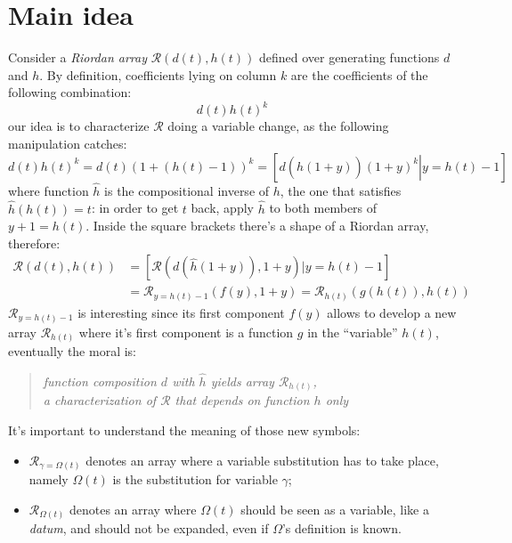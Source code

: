 
\section{Main idea}

Consider a \emph{Riordan array} $\mathcal{R}\left(d(t),h(t)\right)$ 
defined over generating functions $d$ and $h$. 
By definition, coefficients lying on 
column $k$ are the coefficients of the following combination:
\begin{displaymath}
    d(t)h(t)^k
\end{displaymath}
our idea is to characterize $\mathcal{R}$ doing a variable change, as the
following manipulation catches:
\begin{displaymath}
    d(t)h(t)^k = d(t)(1 + (h(t)-1))^k = \left[ \left. d(\hat{h}(1+y))(1+y)^k \right|y = h(t)-1  \right]
\end{displaymath}
where function $\hat{h}$ is the compositional inverse of $h$, the one that
satisfies $\hat{h}(h(t)) = t$: in order to get $t$ back, apply $\hat{h}$ to
both members of $y+1 = h(t)$.
Inside the square brackets there's a shape of a Riordan array, therefore:
\begin{displaymath}
    \begin{split}
        \mathcal{R}\left(d(t),h(t)\right) &= \left[ \mathcal{R}\left(d(\hat{h}(1+y)), 1+y\right) \left| y = h(t)-1 \right. \right]\\
        &= \mathcal{R}_{y=h(t)-1}\left( f(y), 1+y \right) =  \mathcal{R}_{h(t)}\left( g(h(t)), h(t) \right) 
    \end{split}
\end{displaymath}
$\mathcal{R}_{y=h(t)-1}$ is interesting since its first component $f(y)$ allows to 
develop a new array $\mathcal{R}_{h(t)}$ where it's first component
is a function $g$ in the ``variable'' $h(t)$, eventually the moral is:
\begin{quote}
    \emph{function composition $d$ with $\hat{h}$ yields array $\mathcal{R}_{h(t)}$,\\
        a characterization of $\mathcal{R}$ that depends on function $h$ only }
\end{quote}
It's important to understand the meaning of those new symbols:
\begin{itemize}
    \item $\mathcal{R}_{\gamma=\Omega(t)}$ denotes an array where a variable
        substitution has to take place, namely $\Omega(t)$ is the substitution 
        for variable $\gamma$;
    \item $\mathcal{R}_{\Omega(t)}$ denotes an array where $\Omega(t)$ should 
        be seen as a variable, like a \emph{datum}, and should not be expanded,
        even if $\Omega$'s definition is known. 
\end{itemize}

